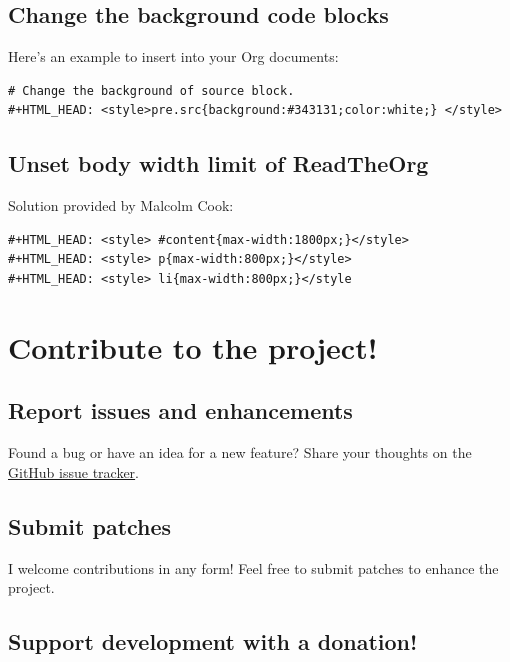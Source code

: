 \documentclass[11pt]{article}
\begin{document}
\subsection{Change the background code blocks}
\label{sec:orge9f859e}

Here's an example to insert into your Org documents:

\begin{verbatim}
# Change the background of source block.
#+HTML_HEAD: <style>pre.src{background:#343131;color:white;} </style>
\end{verbatim}

\subsection{Unset body width limit of ReadTheOrg}
\label{sec:org7404cf5}

Solution provided by Malcolm Cook:

\begin{verbatim}
#+HTML_HEAD: <style> #content{max-width:1800px;}</style>
#+HTML_HEAD: <style> p{max-width:800px;}</style>
#+HTML_HEAD: <style> li{max-width:800px;}</style
\end{verbatim}

\section{Contribute to the project!}
\label{sec:orgddfd2f3}

\subsection{Report issues and enhancements}
\label{sec:org0eb6a6c}

Found a bug or have an idea for a new feature?  Share your thoughts on the
\href{https://github.com/fniessen/org-html-themes/issues/new}{GitHub issue tracker}.

\subsection{Submit patches}
\label{sec:orge8223db}

I welcome contributions in any form!  Feel free to submit patches to enhance the
project.

\subsection{Support development with a donation!}
\label{sec:orgff81331}
\end{document}
